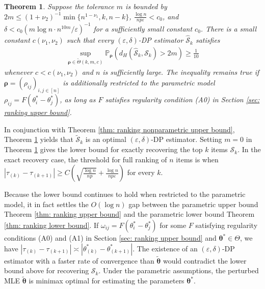 \documentclass[letterpaper,12pt]{article}
\numberwithin{equation}{section}
\theoremstyle{plain}
\newtheorem{Theorem}{Theorem}
\numberwithin{Theorem}{section}
\numberwithin{corollary}{section}
\numberwithin{proposition}{section}
\numberwithin{Lemma}{section}
{
	\theoremstyle{definition}
	\newtheorem{Definition}{Definition}
	\newtheorem{example}{Example}
	\numberwithin{example}{section}
	\newtheorem{fact}{Fact}
	\numberwithin{fact}{section}
	\newtheorem{remark}{Remark}
}
\newcommand{\Pro}{\mathbb{P}}
\newcommand{\1}{\mathbbm{1}}
\def\bth{{\boldsymbol{\theta}}}
\begin{document}
\begin{Theorem}\label{thm: nonparametric ranking lower bound}
	Suppose the tolerance $m$ is bounded by $2m \leq (1 + \nu_2)^{-1}\min\{n^{1-\nu_1}, k, n-k\}$, $\frac{\log n}{np\varepsilon} < c_0$, and $\delta < c_0\left(m\log n \cdot n^{10m}/\varepsilon\right)^{-1}$ for a sufficiently small constant $c_0$. There is a small constant $c(\nu_1, \nu_2)$ such that every $(\varepsilon, \delta)$-DP estimator $\widehat {\mathcal S}_k$ satisfies
	\begin{align}\label{eq: nonparametric ranking lower bound}
		\sup_{\bm \rho \in \widetilde\Theta(k, m, c)}\Pro_{\bm \rho}\left(d_H(\widehat {\mathcal S}_k, \mathcal S_k) > 2m \right) \geq \frac{1}{10}
	\end{align}
	whenever $c < c(\nu_1, \nu_2)$ and $n$ is sufficiently large. The inequality remains true if $\bm \rho = \left(\rho_{ij}\right)_{i, j \in [n]}$ is additionally restricted to the parametric model $\rho_{ij} = F(\theta^*_i - \theta^*_j)$, as long as $F$ satisfies regularity condition (A0) in Section \ref{sec: ranking upper bound}.
\end{Theorem}
In conjunction with Theorem \ref{thm: ranking nonparametric upper bound}, Theorem \ref{thm: nonparametric ranking lower bound} yields that $\widetilde{\mathcal S}_k$ is an optimal $(\varepsilon, \delta)$-DP estimator. Setting $m = 0$ in Theorem \ref{thm: nonparametric ranking lower bound} gives the lower bound for exactly recovering the top $k$ items $\mathcal S_k$. In the exact recovery case, the threshold for full ranking of $n$ items is when $|\tau_{(k)} - \tau_{(k+1)}| \geq C\left( \sqrt{\frac{\log n}{np}} + \frac{\log n}{np\varepsilon}\right)$ for every $k$. 
\begin{remark}\label{rem:top-k-to-l-infty-LB}
	Because the lower bound continues to hold when restricted to the parametric model, it in fact settles the $O(\log n)$ gap between the parametric upper bound Theorem \ref{thm: ranking upper bound} and the parametric lower bound Theorem \ref{thm: ranking lower bound}. If $\omega_{ij} = F(\theta^*_i - \theta^*_j)$ for some $F$ satisfying regularity conditions (A0) and (A1) in Section \ref{sec: ranking upper bound} and $\bth^* \in \Theta$, we have $|\tau_{(k)} - \tau_{(k+1)}| \asymp |\theta^*_{(k)} - \theta^*_{(k+1)}|$. The existence of an $(\varepsilon, \delta)$-DP estimator with a faster rate of convergence than $\widetilde{\bth}$ would contradict the lower bound above for recovering $\mathcal S_k$. Under the parametric assumptions, the perturbed MLE $\widetilde \bth$ is minimax optimal for estimating the parameters $\bth^*$. 
\end{remark}
\end{document}

